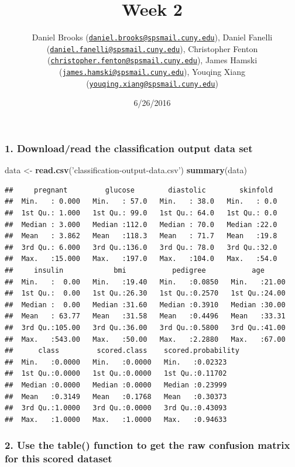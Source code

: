 \documentclass[]{article}
\title{Week 2}
\author{Daniel Brooks
(\href{mailto:daniel.brooks@spsmail.cuny.edu}{\nolinkurl{daniel.brooks@spsmail.cuny.edu}}),
Daniel Fanelli
(\href{mailto:daniel.fanelli@spsmail.cuny.edu}{\nolinkurl{daniel.fanelli@spsmail.cuny.edu}}),
Christopher Fenton
(\href{mailto:christopher.fenton@spsmail.cuny.edu}{\nolinkurl{christopher.fenton@spsmail.cuny.edu}}),
James Hamski
(\href{mailto:james.hamski@spsmail.cuny.edu}{\nolinkurl{james.hamski@spsmail.cuny.edu}}),
Youqing Xiang
(\href{mailto:youqing.xiang@spsmail.cuny.edu}{\nolinkurl{youqing.xiang@spsmail.cuny.edu}})}
\date{6/26/2016}
\newenvironment{Shaded}{\begin{snugshade}}{\end{snugshade}}
\newcommand{\KeywordTok}[1]{\textcolor[rgb]{0.13,0.29,0.53}{\textbf{{#1}}}}
\newcommand{\StringTok}[1]{\textcolor[rgb]{0.31,0.60,0.02}{{#1}}}
\newcommand{\NormalTok}[1]{{#1}}
\begin{document}
\maketitle

\subsubsection{1. Download/read the classification output data
set}\label{downloadread-the-classification-output-data-set}

\begin{Shaded}
\begin{Highlighting}[]
\NormalTok{data <-}\StringTok{ }\KeywordTok{read.csv}\NormalTok{(}\StringTok{'classification-output-data.csv'}\NormalTok{)}
\KeywordTok{summary}\NormalTok{(data)}
\end{Highlighting}
\end{Shaded}

\begin{verbatim}
##     pregnant         glucose        diastolic        skinfold   
##  Min.   : 0.000   Min.   : 57.0   Min.   : 38.0   Min.   : 0.0  
##  1st Qu.: 1.000   1st Qu.: 99.0   1st Qu.: 64.0   1st Qu.: 0.0  
##  Median : 3.000   Median :112.0   Median : 70.0   Median :22.0  
##  Mean   : 3.862   Mean   :118.3   Mean   : 71.7   Mean   :19.8  
##  3rd Qu.: 6.000   3rd Qu.:136.0   3rd Qu.: 78.0   3rd Qu.:32.0  
##  Max.   :15.000   Max.   :197.0   Max.   :104.0   Max.   :54.0  
##     insulin            bmi           pedigree           age       
##  Min.   :  0.00   Min.   :19.40   Min.   :0.0850   Min.   :21.00  
##  1st Qu.:  0.00   1st Qu.:26.30   1st Qu.:0.2570   1st Qu.:24.00  
##  Median :  0.00   Median :31.60   Median :0.3910   Median :30.00  
##  Mean   : 63.77   Mean   :31.58   Mean   :0.4496   Mean   :33.31  
##  3rd Qu.:105.00   3rd Qu.:36.00   3rd Qu.:0.5800   3rd Qu.:41.00  
##  Max.   :543.00   Max.   :50.00   Max.   :2.2880   Max.   :67.00  
##      class         scored.class    scored.probability
##  Min.   :0.0000   Min.   :0.0000   Min.   :0.02323   
##  1st Qu.:0.0000   1st Qu.:0.0000   1st Qu.:0.11702   
##  Median :0.0000   Median :0.0000   Median :0.23999   
##  Mean   :0.3149   Mean   :0.1768   Mean   :0.30373   
##  3rd Qu.:1.0000   3rd Qu.:0.0000   3rd Qu.:0.43093   
##  Max.   :1.0000   Max.   :1.0000   Max.   :0.94633
\end{verbatim}

\subsubsection{2. Use the table() function to get the raw confusion
matrix for this scored
dataset}\label{use-the-table-function-to-get-the-raw-confusion-matrix-for-this-scored-dataset}
\end{document}

